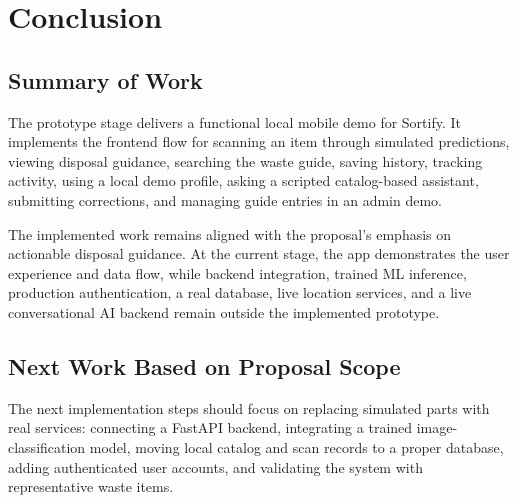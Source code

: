 \documentclass[12pt,a4paper]{report}
\begin{document}
\chapter{Conclusion}

\section{Summary of Work}

The prototype stage delivers a functional local mobile demo for Sortify. It implements the frontend flow for scanning an item through simulated predictions, viewing disposal guidance, searching the waste guide, saving history, tracking activity, using a local demo profile, asking a scripted catalog-based assistant, submitting corrections, and managing guide entries in an admin demo.

The implemented work remains aligned with the proposal's emphasis on actionable disposal guidance. At the current stage, the app demonstrates the user experience and data flow, while backend integration, trained ML inference, production authentication, a real database, live location services, and a live conversational AI backend remain outside the implemented prototype.

\section{Next Work Based on Proposal Scope}

The next implementation steps should focus on replacing simulated parts with real services: connecting a FastAPI backend, integrating a trained image-classification model, moving local catalog and scan records to a proper database, adding authenticated user accounts, and validating the system with representative waste items.
\end{document}
